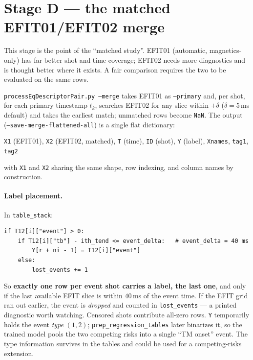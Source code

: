 \documentclass[11pt,a4paper]{article}
\newcommand{\code}[1]{\texttt{\small #1}}
\begin{document}
\section{Stage D --- the matched EFIT01/EFIT02 merge}

This stage is the point of the ``matched study''. EFIT01 (automatic, magnetics-only) has far better
shot and time coverage; EFIT02 needs more diagnostics and is thought better where it exists. A fair
comparison requires the two to be evaluated on the same rows.

\code{processEqDescriptorPair.py --merge} takes EFIT01 as \code{--primary} and, per shot, for each
primary timestamp $t_k$, searches EFIT02 for any slice within $\pm\delta$ ($\delta = 5$\,ms default)
and takes the earliest match; unmatched rows become \code{NaN}. The output
(\code{--save-merge-flattened-all}) is a single flat dictionary:

\begin{center}
\code{X1} (EFIT01), \code{X2} (EFIT02, matched), \code{T} (time), \code{ID} (shot), \code{Y} (label), \code{Xnames}, \code{tag1}, \code{tag2}
\end{center}

with \code{X1} and \code{X2} sharing the same shape, row indexing, and column names by construction.

\paragraph{Label placement.} In \code{table\_stack}:
\begin{verbatim}
if T12[i]["event"] > 0:
    if T12[i]["tb"] - ith_tend <= event_delta:   # event_delta = 40 ms
        Y[r + ni - 1] = T12[i]["event"]
    else:
        lost_events += 1
\end{verbatim}
So \textbf{exactly one row per event shot carries a label, the last one}, and only if the last
available EFIT slice is within $40$\,ms of the event time. If the EFIT grid ran out earlier, the
event is \emph{dropped} and counted in \code{lost\_events} --- a printed diagnostic worth watching.
Censored shots contribute all-zero rows. \code{Y} temporarily holds the event \emph{type} $(1,2)$;
\code{prep\_regression\_tables} later binarizes it, so the trained model pools the two competing
risks into a single ``TM onset'' event. The type information survives in the tables and could be
used for a competing-risks extension.
\end{document}
